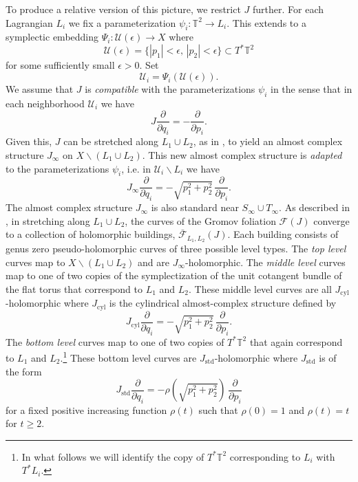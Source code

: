 \documentclass[12pt]{amsart}
\theoremstyle{definition}
\begin{document}
To produce a relative version of this picture, we restrict $J$ further. For each Lagrangian $L_i$ we fix a parameterization  $\psi_i \colon \mathbb{T}^2 \to L_i$. This extends to a symplectic embedding  $\Psi_i \colon \mathcal{U}(\epsilon) \to X$ where $$\mathcal{U}(\epsilon) = \{|p_1| <\epsilon,\, |p_2|< \epsilon\} \subset T^* \mathbb{T}^2$$ for some sufficiently small $\epsilon>0.$  Set $$\mathcal{U}_i =\Psi_i(\mathcal{U}(\epsilon)).$$ We assume that $J$ is {\it compatible} with the parameterizations $\psi_i$ in the sense that in each neighborhood $\mathcal{U}_i$ we have 
$$J \frac{\partial}{\partial q_i} = - \frac{\partial}{\partial p_i}.$$
Given this, $J$ can be stretched along $L_1 \cup L_2$, as in \cite{behwz}, to yield  an almost complex structure $J_{\infty}$ on $X \smallsetminus (L_1 \cup L_2)$. 
This new almost complex structure is {\it adapted} to the parameterizations $\psi_i$, i.e. in $\mathcal{U}_i \smallsetminus L_i$ we have $$J_\infty \frac{\partial}{\partial q_i} = -  \sqrt{p^2_1 + p_2^2}\,\frac{\partial}{\partial p_i}.$$ The almost complex structure $J_\infty$ is also standard near $S_{\infty} \cup T_{\infty}$. 
As described in \cite{behwz}, in stretching along $L_1 \cup L_2$, the curves of the Gromov foliation $\mathcal{F}(J)$ converge to a collection of holomorphic buildings, $\bar{\mathcal{F}}_{L_1,L_2}(J)$. Each building consists of genus zero pseudo-holomorphic curves of three possible level types. The {\em top level} curves  map to $X \smallsetminus (L_1 \cup L_2)$ and are $J_{\infty}$-holomorphic. The {\em middle level} curves map to one of two copies of the symplectization of the unit cotangent bundle of the flat torus that correspond to 
$L_1$ and $L_2$. These middle level curves are all $J_{\mathrm{cyl}}$-holomorphic  where $J_{\mathrm{cyl}}$ is the cylindrical almost-complex structure defined by $$J_{\mathrm{cyl}} \frac{\partial}{\partial q_i} = -  \sqrt{p^2_1 + p_2^2}\,\frac{\partial}{\partial p_i}.$$ The {\em bottom level} curves map to one of two copies of $T^*\mathbb{T}^2$  that again correspond to 
$L_1$ and $L_2$.\footnote{In what follows we will identify the copy of $T^*\mathbb{T}^2$ corresponding to $L_i$ with $T^*L_i$.} These bottom level curves are $J_{\mathrm{std}}$-holomorphic where  $J_{\mathrm{std}}$ is of the form 
$$J_{\mathrm{std}} \frac{\partial}{\partial q_i} = -  \rho \left(\sqrt{p^2_1 + p_2^2}\right)\,\frac{\partial}{\partial p_i}$$ for a fixed positive increasing function $\rho(t)$ such that $\rho(0)=1$ and $\rho(t) =t$ for $t \ge 2.$ 
\end{document}
